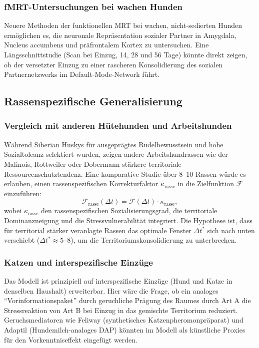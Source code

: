 ﻿\documentclass[12pt, a4paper]{article}
\theoremstyle{plain}
\theoremstyle{definition}
\theoremstyle{remark}
\newcommand{\dt}{\Delta t}
\begin{document}
\subsubsection{fMRT-Untersuchungen bei wachen Hunden}

Neuere Methoden der funktionellen MRT bei wachen, nicht-sedierten Hunden
\cite{berns2012dogs} ermöglichen es, die neuronale Repräsentation sozialer
Partner in Amygdala, Nucleus accumbens und präfrontalem Kortex zu untersuchen.
Eine Längsschnittstudie (Scan bei Einzug, 14, 28 und 56 Tage) könnte direkt
zeigen, ob der versetzter Einzug zu einer rascheren Konsolidierung des sozialen
Partnernetzwerks im Default-Mode-Network führt.

\subsection{Rassenspezifische Generalisierung}

\subsubsection{Vergleich mit anderen Hütehunden und Arbeitshunden}

Während Siberian Huskys für ausgeprägtes Rudelbewusstsein und hohe
Sozialtoleanz selektiert wurden, zeigen andere Arbeitshundrassen wie der
Malinois, Rottweiler oder Dobermann stärkere territoriale Ressourcenschutztendenz.
Eine komparative Studie über 8--10 Rassen würde es erlauben, einen
rassenspezifischen Korrekturfaktor $\kappa_{\text{rasse}}$ in die Zielfunktion
$\mathcal{F}$ einzuführen:
\begin{equation}
  \mathcal{F}_{\text{rasse}}(\dt) = \mathcal{F}(\dt) \cdot \kappa_{\text{rasse}},
\end{equation}
wobei $\kappa_{\text{rasse}}$ den rassenspezifischen Sozialisierungsgrad, die
territoriale Dominanzneigung und die Stressvulnerabilität integriert.
Die Hypothese ist, dass für territorial stärker veranlagte Rassen das optimale
Fenster $\dt^*$ sich nach unten verschiebt ($\dt^* \approx 5$--$8$), um die
Territoriumskonsolidierung zu unterbrechen.

\subsubsection{Katzen und interspezifische Einzüge}

Das Modell ist prinzipiell auf interspezifische Einzüge (Hund und Katze in
denselben Haushalt) erweiterbar. Hier wäre die Frage, ob ein analoges
``Vorinformationspaket'' durch geruchliche Prägung des Raumes durch Art A
die Stressreaktion von Art B bei Einzug in das gemischte Territorium reduziert.
Geruchsmediatoren wie Feliway (synthetisches Katzenpheromonpräparat) und
Adaptil (Hundemilch-analoges DAP) könnten im Modell als künstliche Proxies
für den Vorkenntniseffekt eingefügt werden.
\end{document}
